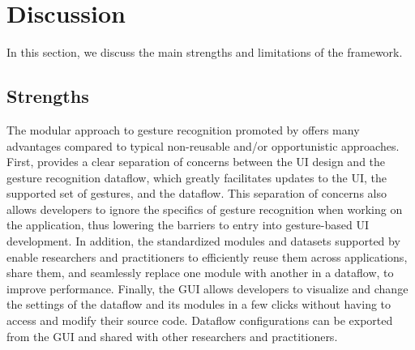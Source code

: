 \section{Discussion} \label{sec:quantumleap:discussion}
In this section, we discuss the main strengths and limitations of the \ql framework.

\subsection{Strengths} \label{sec:quantumleap:discussion:strengths}
The modular approach to gesture recognition promoted by \ql offers many advantages compared to typical non-reusable and/or opportunistic approaches. 
%
First, \ql provides a clear separation of concerns between the UI design and the gesture recognition dataflow, which greatly facilitates updates to the UI, the supported set of gestures, and the dataflow. This separation of concerns also allows developers to ignore the specifics of gesture recognition when working on the application, thus lowering the barriers to entry into gesture-based UI development.
%
In addition, the standardized modules and datasets supported by \ql enable researchers and practitioners to efficiently reuse them across applications, share them, and seamlessly replace one module with another in a dataflow, \eg to improve performance.
%
Finally, the \ql GUI allows developers to visualize and change the settings of the dataflow and its modules in a few clicks without having to access and modify their source code. Dataflow configurations can be exported from the GUI and shared with other researchers and practitioners.

